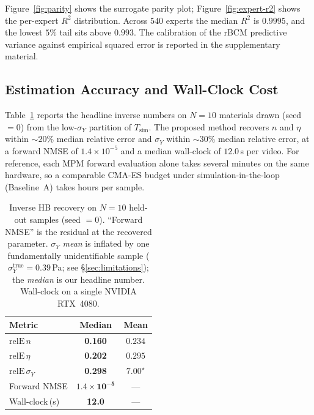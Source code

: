 Figure~\ref{fig:parity} shows the surrogate parity plot;
Figure~\ref{fig:expert-r2} shows the per-expert $R^2$ distribution.
Across $540$ experts the median $R^2$ is $0.9995$, and the lowest
$5\%$ tail sits above $0.993$. The calibration of the rBCM predictive
variance against empirical squared error is reported in the
supplementary material.


\subsection{Estimation Accuracy and Wall-Clock Cost}
\label{sec:mainresults}

Table~\ref{tab:main} reports the headline inverse numbers on $N = 10$
materials drawn (seed $= 0$) from the low-$\sigma_Y$ partition of
$T_{\mathrm{sim}}$. The proposed method recovers $n$ and $\eta$
within $\sim\!20\%$ median relative error and $\sigma_Y$ within
$\sim\!30\%$ median relative error, at a forward NMSE of
$1.4\times 10^{-5}$ and a median wall-clock of $12.0$\,s per video.
For reference, each MPM forward evaluation alone takes several
minutes on the same hardware, so a comparable CMA-ES budget under
simulation-in-the-loop (Baseline~A) takes hours per sample.

\begin{table}[!htbp]
\centering
\small
\caption{Inverse HB recovery on $N=10$ held-out samples (seed $= 0$).
``Forward NMSE'' is the residual at the recovered parameter.
$\sigma_Y$ \emph{mean} is inflated by one fundamentally unidentifiable
sample ($\sigma_Y^{\mathrm{true}} = 0.39$\,Pa; see
\S\ref{sec:limitations}); the \emph{median} is our headline number.
Wall-clock on a single NVIDIA RTX~4080.}
\label{tab:main}
\begin{tabular}{@{}lcc@{}}
\toprule
Metric & Median & Mean \\
\midrule
$\mathrm{relE}\,n$        & \textbf{0.160}               & $0.234$         \\
$\mathrm{relE}\,\eta$     & \textbf{0.202}               & $0.295$         \\
$\mathrm{relE}\,\sigma_Y$ & \textbf{0.298}               & $7.00^{\star}$  \\
Forward NMSE              & $\mathbf{1.4\times 10^{-5}}$ & ---             \\
Wall-clock\,(s)           & \textbf{12.0}                & ---             \\
\bottomrule
\end{tabular}
\end{table}

